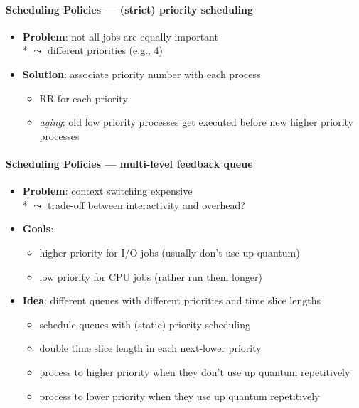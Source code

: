 \paragraph{Scheduling Policies --- (strict) priority scheduling}
\begin{itemize}
  \item \textbf{Problem}: not all jobs are equally important \\*
    \( \leadsto \) different priorities (e.g., 4)
  \item \textbf{Solution}: associate priority number with each process
  \begin{itemize}
    \item RR for each priority
    \item \emph{aging}: old low priority processes get executed before new higher priority processes
  \end{itemize}
\end{itemize}

\paragraph{Scheduling Policies --- multi-level feedback queue}
\begin{itemize}
  \item \textbf{Problem}: context switching expensive \\*
    \( \leadsto \) trade-off between interactivity and overhead?
  \item \textbf{Goals}:
  \begin{itemize}
    \item higher priority for I/O jobs (usually don't use up quantum)
    \item low priority for CPU jobs (rather run them longer)
  \end{itemize}
  \item \textbf{Idea}: different queues with different priorities and time slice lengths
  \begin{itemize}
    \item schedule queues with (static) priority scheduling
    \item double time slice length in each next-lower priority
    \item process to higher priority when they don't use up quantum repetitively
    \item process to lower priority when they use up quantum repetitively
  \end{itemize}
\end{itemize}

